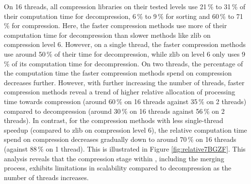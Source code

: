 On 16 threads, all compression libraries on their tested levels use 21\,\% to 31\,\% of their computation time for decompression, 6\,\% to 9\,\% for sorting and 60\,\% to 71\,\% for compression. Here, the faster compression methods use more of their computation time for decompression than slower methods like zlib on compression level 6. However, on a single thread, the faster compression methods use around 50\,\% of their time for decompression, while zlib on level 6 only uses 9\,\% of its computation time for decompression. On two threads, the percentage of the computation time the faster compression methods spend on compression decreases further. However, with further increasing the number of threads, faster compression methods reveal a trend of higher relative allocation of processing time towards compression (around 60\,\% on 16 threads against 35\,\% on 2 threads) compared to decompression (around 30\,\% on 16 threads against 56\,\% on 2 threads). In contrast, for the compression methods with less single-thread speedup (compared to zlib on compression level 6), the relative computation time spend on compression decreases gradually down to around 70\,\% on 16 threads (against 88\,\% on 1 thread). This is illustrated in Figure \ref{fig:relative7BGZF}.
This analysis reveals that the compression stage within \sort, including the merging process, exhibits limitations in scalability compared to decompression as the number of threads increases. 


